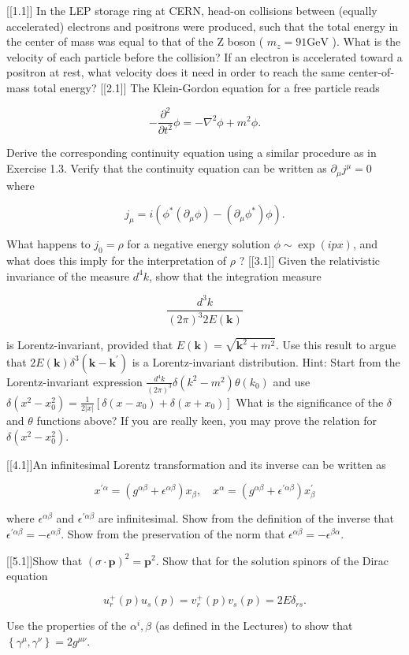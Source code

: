 [[1.1]] In the LEP storage ring at CERN, head-on collisions between (equally accelerated) electrons and positrons were produced, such that the total energy in the center of mass was equal to that of the Z boson ( $m_z=91 \mathrm{GeV}$ ). What is the velocity of each particle before the collision? If an electron is accelerated toward a positron at rest, what velocity does it need in order to reach the same center-of-mass total energy?
[[2.1]] The Klein-Gordon equation for a free particle reads

$$
-\frac{\partial^2}{\partial t^2} \phi=-\nabla^2 \phi+m^2 \phi .
$$


Derive the corresponding continuity equation using a similar procedure as in Exercise 1.3.
Verify that the continuity equation can be written as $\partial_\mu j^\mu=0$ where

$$
j_\mu=i\left(\phi^*\left(\partial_\mu \phi\right)-\left(\partial_\mu \phi^*\right) \phi\right) .
$$


What happens to $j_0=\rho$ for a negative energy solution $\phi \sim \exp (i p x)$, and what does this imply for the interpretation of $\rho$ ?
[[3.1]] Given the relativistic invariance of the measure $d^4 k$, show that the integration measure

$$
\frac{d^3 k}{(2 \pi)^3 2 E(\mathbf{k})}
$$

is Lorentz-invariant, provided that $E(\mathbf{k})=\sqrt{\mathbf{k}^2+m^2}$. Use this result to argue that $2 E(\mathbf{k}) \delta^3\left(\mathbf{k}-\mathbf{k}^{\prime}\right)$ is a Lorentz-invariant distribution.
Hint: Start from the Lorentz-invariant expression $\frac{d^4 k}{(2 \pi)^3} \delta\left(k^2-m^2\right) \theta\left(k_0\right)$ and use $\delta\left(x^2-x_0^2\right)=\frac{1}{2|x|}\left[\delta\left(x-x_0\right)+\delta\left(x+x_0\right)\right]$ What is the significance of the $\delta$ and $\theta$ functions above? If you are really keen, you may prove the relation for $\delta\left(x^2-x_0^2\right)$.

[[4.1]]An infinitesimal Lorentz transformation and its inverse can be written as

$$
x^{\prime \alpha}=\left(g^{\alpha \beta}+\epsilon^{\alpha \beta}\right) x_\beta, \quad x^\alpha=\left(g^{\alpha \beta}+\epsilon^{\prime \alpha \beta}\right) x_\beta^{\prime}
$$

where $\epsilon^{\alpha \beta}$ and $\epsilon^{\prime \alpha \beta}$ are infinitesimal. Show from the definition of the inverse that $\epsilon^{\prime \alpha \beta}=- \epsilon^{\alpha \beta}$. Show from the preservation of the norm that $\epsilon^{\alpha \beta}=-\epsilon^{\beta \alpha}$.

[[5.1]]Show that $(\sigma \cdot \mathbf{p})^2=\mathbf{p}^2$. Show that for the solution spinors of the Dirac equation

$$
u_r^{+}(p) u_s(p)=v_r^{+}(p) v_s(p)=2 E \delta_{r s} .
$$


Use the properties of the $\alpha^i, \beta$ (as defined in the Lectures) to show that $\left\{\gamma^\mu, \gamma^\nu\right\}=2 g^{\mu \nu}$.